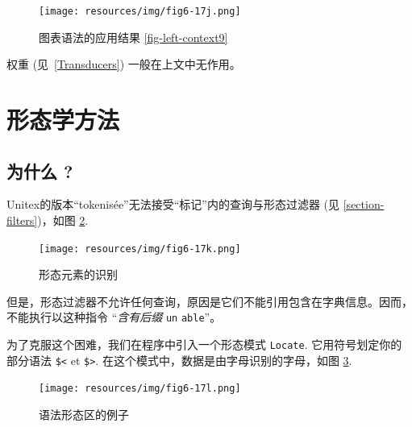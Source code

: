 \begin{figure}[!ht]
\begin{center}
\texttt{[image: resources/img/fig6-17j.png]}
\caption{图表语法的应用结果
\ref{fig-left-context9}\label{fig-left-context10}}
\end{center}
\end{figure}

\bigskip
\noindent 权重 (见~\ref{Transducers}) 一般在上文中无作用。

\clearpage

\section{形态学方法}
\label{section-morphological-mode}
\subsection{为什么 ?}
Unitex的版本“tokenisée”无法接受“标记”内的查询与形态过滤器
(见 \ref{section-filters})，如图
\ref{fig-morpho1}.

\begin{figure}[!ht]
\begin{center}
\texttt{[image: resources/img/fig6-17k.png]}
\caption{形态元素的识别\label{fig-morpho1}}
\end{center}
\end{figure}

\bigskip
\noindent 但是，形态过滤器不允许任何查询，原因是它们不能引用包含在字典信息。因而，不能执行以这种指令 ``\textit{含有后缀} \verb$un$ \verb+able+''。

\bigskip
\noindent 为了克服这个困难，我们在程序中引入一个形态模式
\verb$Locate$. 它用符号划定你的部分语法 \verb+$<+ et \verb+$>+.\index{\verb+$<+}\index{\verb+$>+}
在这个模式中，数据是由字母识别的字母，如图
\ref{fig-morpho2}.

\begin{figure}[!ht]
\begin{center}
\texttt{[image: resources/img/fig6-17l.png]}
\caption{语法形态区的例子\label{fig-morpho2}}
\end{center}
\end{figure}

